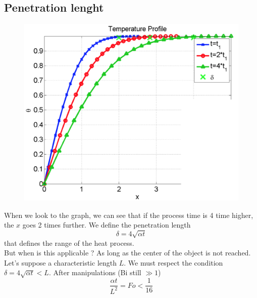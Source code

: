 	\subsection{Penetration lenght}
		\begin{figure}
		\vspace{-5mm}
		\includegraphics[scale=0.2]{ch4/4}
		\end{figure}	
		When we look to the graph, we can see that if the process time is 4 time higher, the $x$ goes 2 times further. We define the penetration length 
		\begin{equation}
			\delta = 4\sqrt{\alpha t}
		\end{equation}
		that defines the range of the heat process. \\
		But when is this applicable ? As long as the center of the object is not reached. Let's suppose a characteristic length $L$. We must respect the condition $\delta = 4\sqrt{\alpha t} < L$. After manipulations (Bi still $\gg 1$)
		\begin{equation}
			\frac{\alpha t}{L^2} = Fo < \frac{1}{16}
		\end{equation}
	
